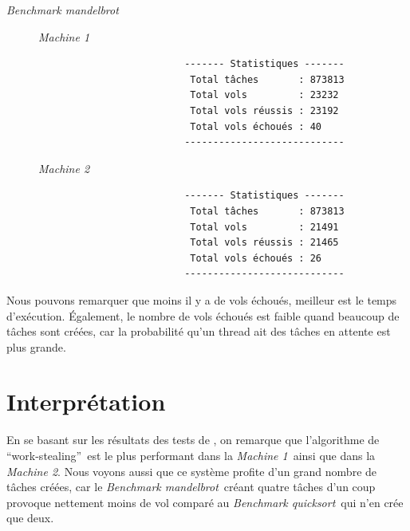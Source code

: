 \documentclass[a4paper]{article}
\def\mone{\textit{Machine 1}} %
\def\mtwo{\textit{Machine 2}} %
\def\bone{\textit{Benchmark quicksort}}
\def\btwo{\textit{Benchmark mandelbrot}}
\def\ws{\enquote{work-stealing}}
\newcommand{\docref}[1]{\textit{\nameref{#1}}} %
\begin{document}
\begin{description}
  \item[\btwo] \hspace{1em}
        \begin{description}
          \item[\mone] \hspace{1em}
                \begin{samepage}
                  \begin{verbatim}
                    ------- Statistiques -------
                     Total tâches       : 873813
                     Total vols         : 23232
                     Total vols réussis : 23192
                     Total vols échoués : 40
                    ----------------------------
                  \end{verbatim}
                \end{samepage}
          \item[\mtwo] \hspace{1em}
                \begin{samepage}
                  \begin{verbatim}
                    ------- Statistiques -------
                     Total tâches       : 873813
                     Total vols         : 21491
                     Total vols réussis : 21465
                     Total vols échoués : 26
                    ----------------------------
                  \end{verbatim}
                \end{samepage}
        \end{description}
\end{description}

Nous pouvons remarquer que moins il y a de vols échoués, meilleur est
le temps d'exécution. Également, le nombre de vols échoués est faible quand
beaucoup de tâches sont créées, car la probabilité qu'un thread ait des tâches
en attente est plus grande.


\section{Interprétation}
En se basant sur les résultats des tests de \docref{sec:stats}, on remarque
que l'algorithme de \ws~est le plus performant dans la \mone~ainsi que dans
la \mtwo. Nous voyons aussi que ce système profite d'un grand nombre de
tâches créées, car le \btwo~créant quatre tâches d'un coup provoque nettement
moins de vol comparé au \bone~qui n'en crée que deux.
\end{document}
